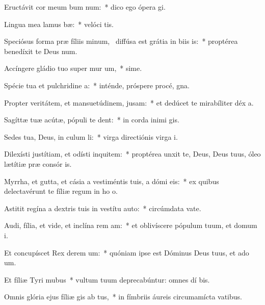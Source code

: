 \item Eructávit cor meum bum num:~* dico ego ópera  gi.
\item Lingua mea lamus bæ:~* velóci tis.
\item Speciósus forma præ fíliis minum,~\pscross{} diffúsa est grátia in biis is:~* proptérea benedíxit te Deus  num.
\item Accíngere gládio tuo super mur um,~* sime.
\item Spécie tua et pulchridine a:~* inténde, próspere procé,  gna.
\item Propter veritátem, et mansuetúdinem,  jusam:~* et dedúcet te mirabíliter déx a.
\item Sagíttæ tuæ acútæ, pópuli  te dent:~* in corda inimi gis.
\item Sedes tua, Deus, in culum li:~* virga directiónis virga  i.
\item Dilexísti justítiam, et odísti inquitem:~* proptérea unxit te, Deus, Deus tuus, óleo lætítiæ præ consór is.
\item Myrrha, et gutta, et cásia a vestiméntis tuis, a dómi eis:~* ex quibus delectavérunt te fíliæ regum in ho o.
\item Astitit regína a dextris tuis in vestítu auto:~* circúmdata vate.
\item Audi, fília, et vide, et inclína rem am:~* et oblivíscere pópulum tuum, et domum  i.
\item Et concupíscet Rex derem um:~* quóniam ipse est Dóminus Deus tuus, et ado um.
\item Et fíliæ Tyri  mubus~* vultum tuum deprecabúntur: omnes dí bis.
\item Omnis glória ejus fíliæ gis ab tus,~* in fímbriis áureis circumamícta vatibus.
